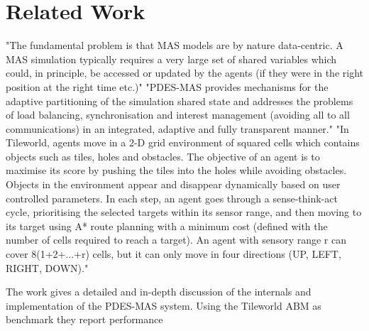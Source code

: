 \section{Related Work}
\label{sec:rel_work}

"The fundamental problem is that MAS models are by nature data-centric. A MAS simulation typically requires a very large set of shared variables which could, in principle, be accessed or updated by the agents (if they were in the right position at the right time etc.)"
"PDES-MAS provides mechanisms for the adaptive partitioning of the simulation shared state and addresses
the problems of load balancing, synchronisation and interest management (avoiding all to all communications) in
an integrated, adaptive and fully transparent manner."
"In Tileworld, agents move in a 2-D grid environment of squared cells which contains objects such as tiles, holes and obstacles. The objective of an agent is to maximise its score by pushing the tiles into the holes while avoiding obstacles. Objects in the environment appear and disappear dynamically based on user controlled parameters. In each step, an agent goes through a sense-think-act cycle, prioritising the selected targets within its sensor range, and then moving to its target using A* route planning with a minimum cost (defined with the number of cells required to reach a target). An agent
with sensory range r can cover 8(1+2+...+r) cells, but it can only move in four directions (UP, LEFT, RIGHT,
DOWN)."

The work \cite{suryanarayanan_pdes-mas_2013} gives a detailed and in-depth discussion of the internals and implementation of the PDES-MAS system. Using the Tileworld ABM as benchmark they report performance





